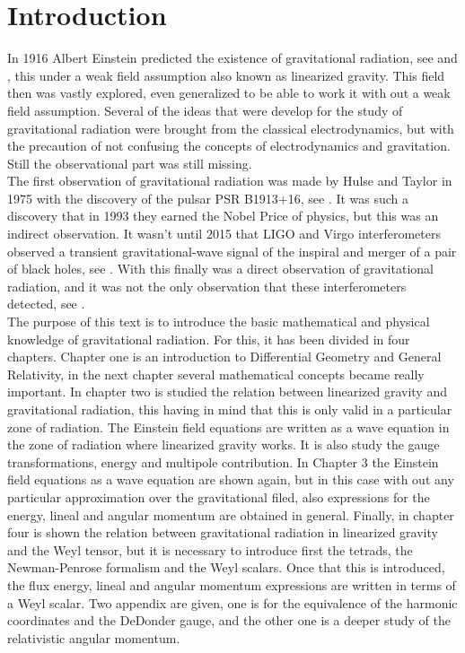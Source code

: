 \chapter*{Introduction}
In 1916 Albert Einstein predicted the existence of gravitational radiation, see \cite{1916} and \cite{1918}, this under a weak field assumption also known as linearized gravity. This field then was vastly explored, even generalized to be able to work it with out a weak field assumption. Several of the ideas that were develop for the study of gravitational radiation were brought from the classical electrodynamics, but with the precaution of not confusing the concepts of electrodynamics and gravitation. Still the observational part was still missing.\\
The first observation of gravitational radiation was made by Hulse and Taylor in 1975 with the discovery of the pulsar PSR B1913$+$16, see \cite{HULSE}. It was such a discovery that in 1993 they earned the Nobel Price of physics, but this was an indirect observation. It wasn't until 2015 that LIGO and Virgo interferometers observed a transient gravitational-wave signal of the inspiral and merger of a pair of black holes, see \cite{LIGO}. With this finally was a direct observation of gravitational radiation, and it was not the only observation that these interferometers detected, see \cite{VIRGO}.\\
The purpose of this text is to introduce the basic mathematical and physical knowledge of gravitational radiation. For this, it has been divided in four chapters. Chapter one is an introduction to Differential Geometry and General Relativity, in the next chapter several mathematical concepts became really important. In chapter two is studied the relation between linearized gravity and gravitational radiation, this having in mind that this is only valid in a particular zone of radiation. The Einstein field equations are written as a wave equation in the zone of radiation where linearized gravity works. It is also study the gauge transformations, energy and multipole contribution. In Chapter 3 the Einstein field equations as a wave equation are shown again, but in this case with out any particular approximation over the gravitational filed, also expressions for the energy, lineal and angular momentum are obtained in general. Finally, in chapter four is shown the relation between gravitational radiation in linearized gravity and the Weyl tensor, but it is necessary to introduce first the tetrads, the Newman-Penrose formalism and the Weyl scalars. Once that this is introduced,  the flux energy, lineal and angular momentum expressions are written in terms of a Weyl scalar. Two appendix are given, one is for the equivalence of the harmonic coordinates and the DeDonder gauge, and the other one is a deeper study of the relativistic angular momentum.